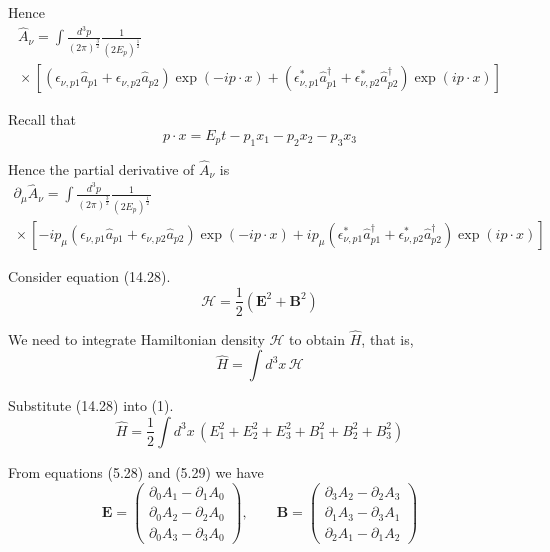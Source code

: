 \documentclass[12pt]{article}
\begin{document}
Hence
\begin{multline*}
\hat A_\nu=\int\frac{d^3p}{(2\pi)^\frac{3}{2}}\frac{1}{(2E_p)^\frac{1}{2}}
\\
{}\times
\left[
(\epsilon_{\nu,p1}\hat a_{p1}+\epsilon_{\nu,p2}\hat a_{p2})\exp(-ip\cdot x)
+(\epsilon_{\nu,p1}^*\hat a_{p1}^\dag+\epsilon_{\nu,p2}^*\hat a_{p2}^\dag)\exp(ip\cdot x)
\right]
\end{multline*}

Recall that
\begin{equation*}
p\cdot x=E_pt-p_1x_1-p_2x_2-p_3x_3
\end{equation*}

Hence the partial derivative of $\hat A_\nu$ is
\begin{multline*}
\partial_\mu\hat A_\nu=\int\frac{d^3p}{(2\pi)^\frac{3}{2}}\frac{1}{(2E_p)^\frac{1}{2}}
\\
{}\times
\left[
-ip_\mu(\epsilon_{\nu,p1}\hat a_{p1}+\epsilon_{\nu,p2}\hat a_{p2})\exp(-ip\cdot x)
+ip_\mu(\epsilon_{\nu,p1}^*\hat a_{p1}^\dag+\epsilon_{\nu,p2}^*\hat a_{p2}^\dag)\exp(ip\cdot x)
\right]
\end{multline*}

Consider equation (14.28).
\begin{equation*}
\mathcal H=\frac{1}{2}(\mathbf E^2+\mathbf B^2)
\tag{14.28}
\end{equation*}

We need to integrate Hamiltonian density $\mathcal H$ to obtain $\hat H$, that is,
\begin{equation*}
\hat H=\int d^3x\,\mathcal H
\tag{1}
\end{equation*}

Substitute (14.28) into (1).
\begin{equation*}
\hat H=\frac{1}{2}\int d^3x\,\left(E_1^2+E_2^2+E_3^2+B_1^2+B_2^2+B_3^2\right)
\end{equation*}

From equations (5.28) and (5.29) we have
\begin{equation*}
\mathbf E=\begin{pmatrix}
\partial_0A_1-\partial_1A_0
\\
\partial_0A_2-\partial_2A_0
\\
\partial_0A_3-\partial_3A_0
\end{pmatrix},
\qquad
\mathbf B=\begin{pmatrix}
\partial_3A_2-\partial_2A_3
\\
\partial_1A_3-\partial_3A_1
\\
\partial_2A_1-\partial_1A_2
\end{pmatrix}
\end{equation*}
\end{document}

